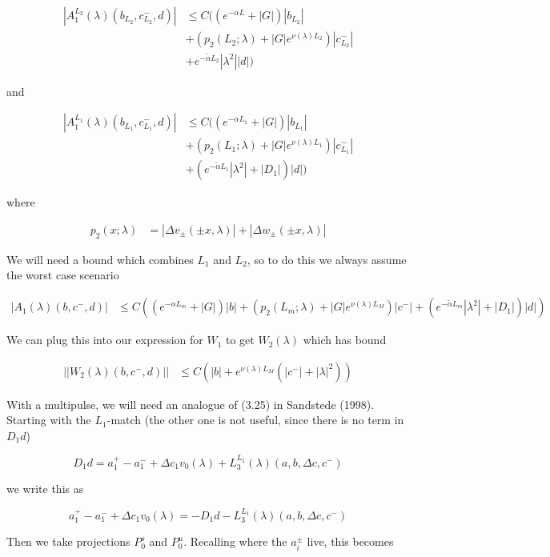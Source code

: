 \documentclass[12pt]{article}
\begin{document}
\begin{enumerate}
\begin{align*}
|A_1^{L_2}(\lambda)(b_{L_2}, c_{L_2}^-, d)| &\leq C ( (e^{-\alpha L} + |G|)|b_{L_2}| \\
&+ ( p_2(L_2; \lambda) + |G|e^{\nu(\lambda)L_2})|c_{L_2}^-| \\
&+ e^{-\tilde{\alpha}L_2} |\lambda^2||d|)
\end{align*}

and

\begin{align*}
|A_1^{L_1}(\lambda)(b_{L_1}, c_{L_1}^-, d)| &\leq C ( ( e^{-\alpha L_1} + |G|)|b_{L_1}| \\
&+ ( p_2(L_1; \lambda) + |G|e^{\nu(\lambda) L_1})|c_{L_1}^-| \\
&+ (e^{-\tilde{\alpha}L_1}|\lambda^2| + |D_1|)|d|)
\end{align*}

where

\begin{align*}
p_2(x; \lambda) &= |\Delta v_\pm(\pm x, \lambda)| + |\Delta w_\pm(\pm x, \lambda)| 
\end{align*}

We will need a bound which combines $L_1$ and $L_2$, so to do this we always assume the worst case scenario

\begin{align*}
|A_1(\lambda)(b, c^-, d)| &\leq C ( ( e^{-\alpha L_m} + |G|)|b|
+ ( p_2(L_m; \lambda) + |G|e^{\nu(\lambda) L_M})|c^-| 
+ (e^{-\tilde{\alpha}L_m}|\lambda^2| + |D_1|)|d|)
\end{align*}

We can plug this into our expression for $W_1$ to get $W_2(\lambda)$ which has bound

\begin{align*}
||W_2(\lambda)(b,c^-, d)|| &\leq C (|b| + e^{\nu(\lambda)L_M}(|c^-| + |\lambda|^2))
\end{align*}

With a multipulse, we will need an analogue of (3.25) in Sandstede (1998). Starting with the $L_1$-match (the other one is not useful, since there is no term in $D_1 d$)

\[
D_1 d = a_1^+ - a_1^- + \Delta c_1 v_0(\lambda) + L_3^{L_1}(\lambda)(a, b, \Delta c, c^-)
\]

we write this as

\[
a_1^+ - a_1^- + \Delta c_1 v_0(\lambda) = -D_1 d - L_3^{L_1}(\lambda)(a, b, \Delta c, c^-)
\]

Then we take projections $P^s_0$ and $P^u_0$. Recalling where the $a_i^\pm$ live, this becomes 


\end{enumerate}
\end{document}
